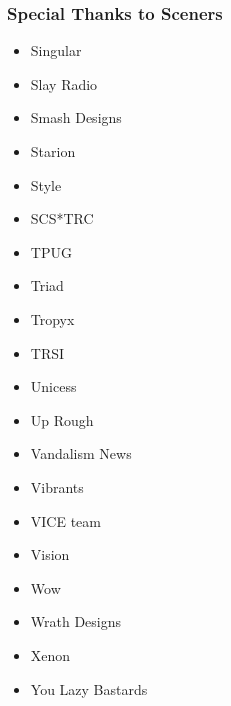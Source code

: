 \begin{frame}
\frametitle{Special Thanks to Sceners}

\begin{multicols}{3}
\begin{itemize}
\item Singular
\item Slay Radio
\item Smash Designs
\item Starion
\item Style
\item SCS*TRC
\item TPUG
\item Triad
\item Tropyx
\item TRSI
\item Unicess
\item Up Rough
\item Vandalism News
\item Vibrants
\item VICE team
\item Vision
\item Wow
\item Wrath Designs
\item Xenon
\item You Lazy Bastards
\end{itemize}
\end{multicols}

\end{frame}
